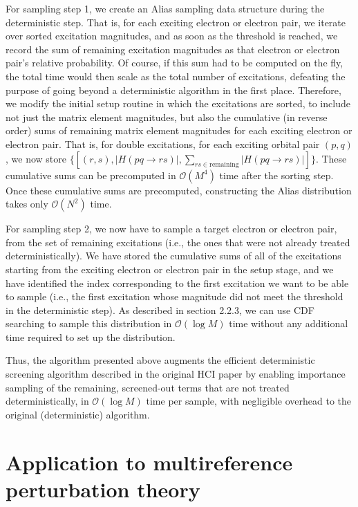 \documentclass[english]{article}
\begin{document}
For sampling step 1, we create an Alias sampling data structure during the deterministic step. That is, for each exciting electron or electron pair, we iterate over sorted excitation magnitudes, and as soon as the threshold is reached, we record the sum of remaining excitation magnitudes as that electron or electron pair's relative probability. Of course, if this sum had to be computed on the fly, the total time would then scale as the total number of excitations, defeating the purpose of going beyond a deterministic algorithm in the first place. Therefore, we modify the initial setup routine in which the excitations are sorted, to include not just the matrix element magnitudes, but also the cumulative (in reverse order) sums of remaining matrix element magnitudes for each exciting electron or electron pair. That is, for double excitations, for each exciting orbital pair $(p,q)$, we now store $\{[(r,s), |H(pq\rightarrow rs)|, \sum_{rs\in\textrm{remaining}}|H(pq\rightarrow rs)|]\}$. These cumulative sums can be precomputed in $\mathcal{O}(M^4)$ time after the sorting step. Once these cumulative sums are precomputed, constructing the Alias distribution takes only $\mathcal{O}(N^2)$ time.

For sampling step 2, we now have to sample a target electron or electron pair, from the set of remaining excitations (i.e., the ones that were not already treated deterministically). We have stored the cumulative sums of all of the excitations starting from the exciting electron or electron pair in the setup stage, and we have identified the index corresponding to the first excitation we want to be able to sample (i.e., the first excitation whose magnitude did not meet the threshold in the deterministic step). As described in section 2.2.3, we can use CDF searching to sample this distribution in $\mathcal{O}(\log M)$ time without any additional time required to set up the distribution.

Thus, the algorithm presented above augments the efficient deterministic screening algorithm described in the original HCI paper by enabling importance sampling of the remaining, screened-out terms that are not treated deterministically, in $\mathcal{O}(\log M)$ time per sample, with negligible overhead to the original (deterministic) algorithm.

\section{Application to multireference perturbation theory}
\end{document}

